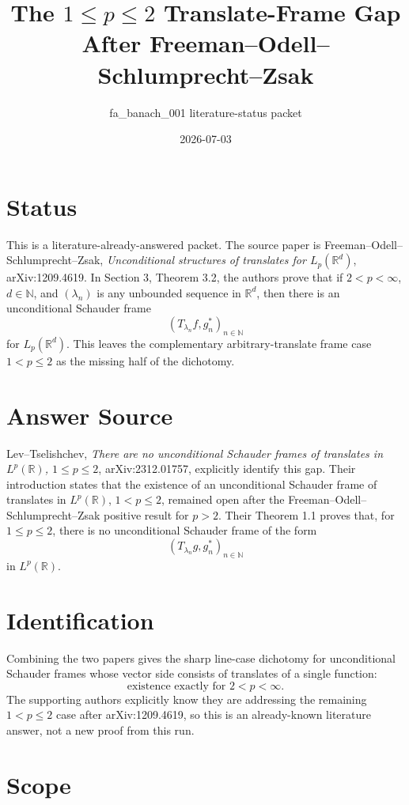 \documentclass[11pt]{amsart}
\title{The \(1\le p\le2\) Translate-Frame Gap After Freeman--Odell--Schlumprecht--Zsak}
\author{fa\_banach\_001 literature-status packet}
\date{2026-07-03}
\begin{document}
\maketitle

\section*{Status}

This is a literature-already-answered packet.  The source paper is
Freeman--Odell--Schlumprecht--Zsak, \emph{Unconditional structures of
translates for \(L_p(\mathbb R^d)\)}, arXiv:1209.4619.  In Section 3,
Theorem 3.2, the authors prove that if \(2<p<\infty\), \(d\in\mathbb N\),
and \((\lambda_n)\) is any unbounded sequence in \(\mathbb R^d\), then there
is an unconditional Schauder frame
\[
  (T_{\lambda_n}f,g_n^*)_{n\in\mathbb N}
\]
for \(L_p(\mathbb R^d)\).  This leaves the complementary arbitrary-translate
frame case \(1<p\le2\) as the missing half of the dichotomy.

\section*{Answer Source}

Lev--Tselishchev, \emph{There are no unconditional Schauder frames of
translates in \(L^p(\mathbb R)\), \(1\le p\le2\)}, arXiv:2312.01757,
explicitly identify this gap.  Their introduction states that the existence
of an unconditional Schauder frame of translates in \(L^p(\mathbb R)\),
\(1<p\le2\), remained open after the Freeman--Odell--Schlumprecht--Zsak
positive result for \(p>2\).  Their Theorem 1.1 proves that, for
\(1\le p\le2\), there is no unconditional Schauder frame of the form
\[
  (T_{\lambda_n}g,g_n^*)_{n\in\mathbb N}
\]
in \(L^p(\mathbb R)\).

\section*{Identification}

Combining the two papers gives the sharp line-case dichotomy for
unconditional Schauder frames whose vector side consists of translates of a
single function:
\[
  \text{existence exactly for } 2<p<\infty.
\]
The supporting authors explicitly know they are addressing the remaining
\(1<p\le2\) case after arXiv:1209.4619, so this is an
already-known literature answer, not a new proof from this run.

\section*{Scope}
\end{document}
